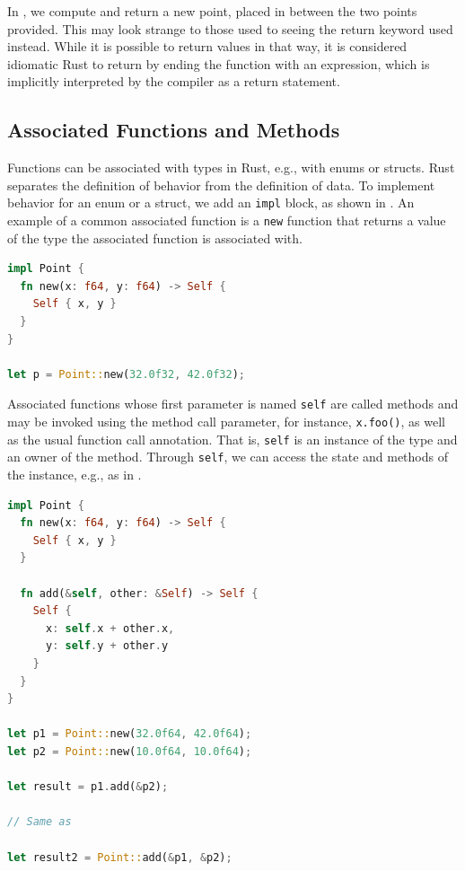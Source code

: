 \documentclass[paper=a4,%
  twoside,%
  BCOR4mm,%
  abstract=true,%
  toc=bibliography,%
  chapterprefix=true,%
  toc=bibliographynumbered,%
  open=right,%
  english,%
  pagesize=pdftex]{scrreprt}
\begin{document}
In , we compute and return a new point, placed in between the two points provided. This may look strange to those used to seeing the return keyword used instead. While it is possible to return values in that way, it is considered idiomatic Rust to return by ending the function with an expression, which is implicitly interpreted by the compiler as a return statement.

\subsection{Associated Functions and Methods}
Functions can be associated with types in Rust, e.g., with enums or structs. Rust separates the definition of behavior from the definition of data. To implement behavior for an enum or a struct, we add an \lstinline{impl} block, as shown in . An example of a common associated function is a \lstinline{new} function that returns a value of the type the associated function is associated with.

\begin{lstlisting}[language=Rust, style=boxed, caption={Associating behavior with the \lstinline{Point} data type defined in \Cref{lst:example-struct-enum}}, label=lst:example-associated-function]
impl Point {
  fn new(x: f64, y: f64) -> Self {
    Self { x, y }
  }
}

let p = Point::new(32.0f32, 42.0f32);
\end{lstlisting}

Associated functions whose first parameter is named \lstinline{self} are called methods and may be invoked using the method call parameter, for instance, \lstinline{x.foo()}, as well as the usual function call annotation. That is, \lstinline{self} is an instance of the type and an owner of the method. Through \lstinline{self}, we can access the state and methods of the instance, e.g., as in .

\begin{lstlisting}[language=Rust, style=boxed, caption={Defining a method on \lstinline{Point} data type from \Cref{lst:example-struct-enum}}, label=lst:example-method]
impl Point {
  fn new(x: f64, y: f64) -> Self {
    Self { x, y }
  }

  fn add(&self, other: &Self) -> Self {
    Self {
      x: self.x + other.x,
      y: self.y + other.y
    }
  }
}

let p1 = Point::new(32.0f64, 42.0f64);
let p2 = Point::new(10.0f64, 10.0f64);

let result = p1.add(&p2);

// Same as

let result2 = Point::add(&p1, &p2);
\end{lstlisting}
\end{document}
